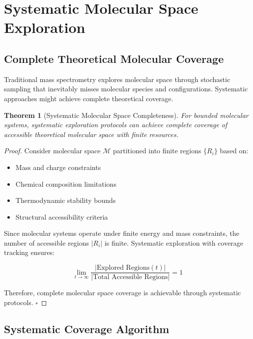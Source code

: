 \documentclass[11pt,a4paper]{article}
\newtheorem{theorem}{Theorem}[section]
\theoremstyle{remark}
\begin{document}
\section{Systematic Molecular Space Exploration}

\subsection{Complete Theoretical Molecular Coverage}

Traditional mass spectrometry explores molecular space through stochastic sampling that inevitably misses molecular species and configurations. Systematic approaches might achieve complete theoretical coverage.

\begin{theorem}[Systematic Molecular Space Completeness]
For bounded molecular systems, systematic exploration protocols can achieve complete coverage of accessible theoretical molecular space with finite resources.
\end{theorem}

\begin{proof}
Consider molecular space $\mathcal{M}$ partitioned into finite regions $\{R_i\}$ based on:
\begin{itemize}
\item Mass and charge constraints
\item Chemical composition limitations  
\item Thermodynamic stability bounds
\item Structural accessibility criteria
\end{itemize}

Since molecular systems operate under finite energy and mass constraints, the number of accessible regions $|R_i|$ is finite. Systematic exploration with coverage tracking ensures:

$$\lim_{t \to \infty} \frac{|\text{Explored Regions}(t)|}{|\text{Total Accessible Regions}|} = 1$$

Therefore, complete molecular space coverage is achievable through systematic protocols. $\square$
\end{proof}

\subsection{Systematic Coverage Algorithm}
\end{document}
